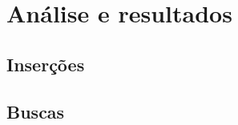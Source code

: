 \chapter{Análise  e resultados}\label{cap-analise-resultado}

\lipsum[10]

\section{Inserções}

\section{Buscas}

